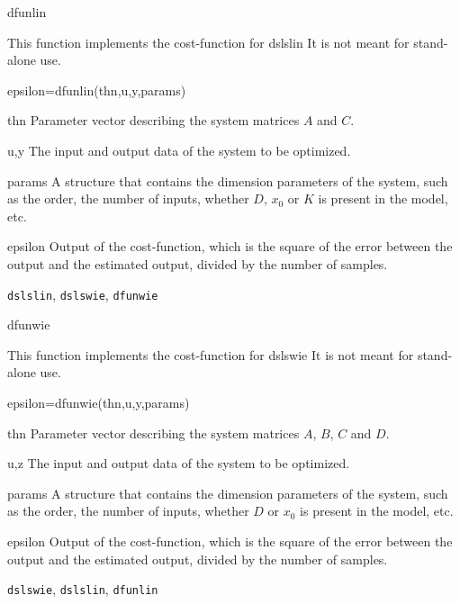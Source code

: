 \documentclass{book}
\newcommand{\dslslin}{\texttt{dslslin}}
\newcommand{\dslswie}{\texttt{dslswie}}
\newcommand{\dfunlin}{\texttt{dfunlin}}
\newcommand{\dfunwie}{\texttt{dfunwie}}
\begin{document}
\begin{command}{dfunlin}
\begin{purpose}This function implements the cost-function for dslslin
  It is not meant for stand-alone use. 
\end{purpose}
\begin{syntax}
epsilon=dfunlin(thn,u,y,params)
\end{syntax}
\begin{inputs}
\item[thn] Parameter vector describing the system matrices $A$ and $C$.
\item[u,y] The input and output data of the system to be optimized.
\item[params] A structure that contains the dimension parameters of
  the system, such as the order, the number of inputs, whether $D$, $x_0$
  or $K$ is present in the model, etc.
\end{inputs}
\begin{outputs}
\item[epsilon] Output of the cost-function, which is the square of the
  error between the output and the estimated output, divided by the
  number of samples.
\end{outputs}

\begin{seealso}
{\dslslin}, {\dslswie}, {\dfunwie}
\end{seealso}
\end{command}%

\begin{command}{dfunwie}
\begin{purpose}This function implements the cost-function for dslswie
  It is not meant for stand-alone use. 
\end{purpose}
\begin{syntax}
epsilon=dfunwie(thn,u,y,params)
\end{syntax}
\begin{inputs}
\item[thn] Parameter vector describing the system matrices $A$, $B$,
  $C$ and $D$.
\item[u,z] The input and output data of the system to be optimized.
\item[params] A structure that contains the dimension parameters of
  the system, such as the order, the number of inputs, whether $D$ or
  $x_0$ is present in the model, etc.
\end{inputs}
\begin{outputs}
\item[epsilon] Output of the cost-function, which is the square of the
  error between the output and the estimated output, divided by the
  number of samples.
\end{outputs}

\begin{seealso}
{\dslswie}, {\dslslin}, {\dfunlin}
\end{seealso}
\end{command}%
\end{document}
